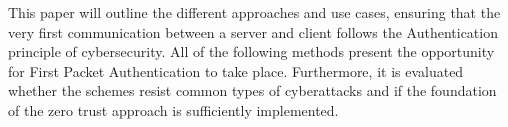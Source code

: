 This paper will outline the different approaches and use cases, ensuring that the very first communication between a server and client follows the Authentication principle of cybersecurity.  All of the following methods present the opportunity for First Packet Authentication to take place. Furthermore, it is evaluated whether the schemes resist common types of cyberattacks and if the foundation of the zero trust approach is sufficiently implemented.\\\par
